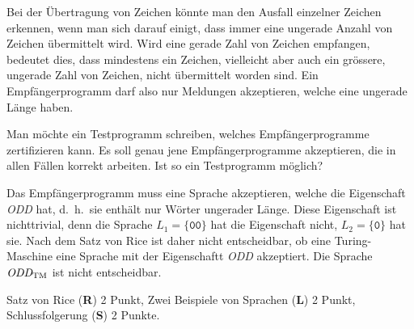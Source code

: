 Bei der Übertragung von Zeichen könnte man den Ausfall einzelner
Zeichen erkennen, wenn man sich darauf einigt, dass immer eine ungerade
Anzahl von Zeichen übermittelt wird.
Wird eine gerade Zahl von Zeichen empfangen, bedeutet dies, dass mindestens
ein Zeichen, vielleicht aber auch ein grössere, ungerade Zahl von Zeichen,
nicht übermittelt worden sind.
Ein Empfängerprogramm darf also nur Meldungen akzeptieren, welche eine
ungerade Länge haben.

Man möchte ein Testprogramm schreiben, welches Empfängerprogramme
zertifizieren kann.
Es soll genau jene Empfängerprogramme akzeptieren, die in allen Fällen
korrekt arbeiten.
Ist so ein Testprogramm möglich?

\begin{loesung}
Das Empfängerprogramm muss eine Sprache akzeptieren, welche die Eigenschaft
{\em ODD} hat, d.~h.~sie enthält nur Wörter ungerader Länge.
Diese Eigenschaft ist nichttrivial, denn die Sprache $L_1=\{\texttt{00}\}$
hat die Eigenschaft nicht, $L_2=\{\texttt{0}\}$ hat sie.
Nach dem Satz von Rice ist daher nicht entscheidbar, ob eine Turing-Maschine
eine Sprache mit der Eigenschaftt {\em ODD} akzeptiert.
Die Sprache $\text{\em ODD}_{\text{TM}}$ ist nicht entscheidbar.
\end{loesung}

\begin{bewertung}
Satz von Rice ({\bf R}) 2 Punkt,
Zwei Beispiele von Sprachen ({\bf L}) 2 Punkt,
Schlussfolgerung ({\bf S}) 2 Punkte.
\end{bewertung}

